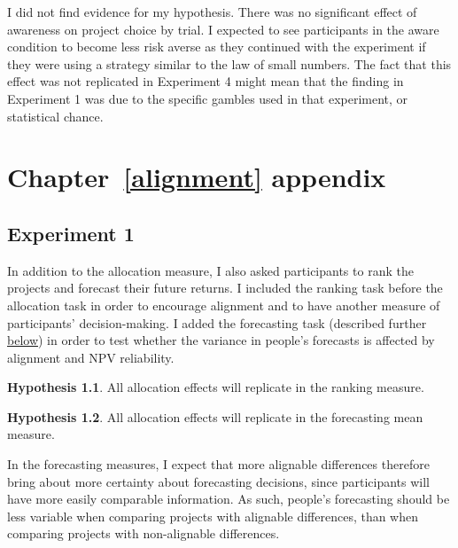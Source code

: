 \documentclass[a4paper, nobind, dvipsnames]{templates/ociamthesis}
\theoremstyle{definition}
\theoremstyle{definition}
\theoremstyle{definition}
\theoremstyle{definition}
\newtheorem{hypothesis}{Hypothesis}[chapter]
\theoremstyle{remark}
\begin{document}
I did not find evidence for my hypothesis. There was no significant effect of
awareness on project choice by trial. I expected to see participants in the
aware condition to become less risk averse as they continued with the experiment
if they were using a strategy similar to the law of small numbers. The fact that
this effect was not replicated in Experiment 4 might mean that the finding in
Experiment 1 was due to the specific gambles used in that experiment, or
statistical chance.

\hypertarget{alignment-appendix}{%
\chapter{Chapter~\ref{alignment} appendix}\label{alignment-appendix}}

\minitoc

\hypertarget{alignment-2-appendix}{%
\section{Experiment 1}\label{alignment-2-appendix}}

In addition to the allocation measure, I also asked participants to rank the projects and forecast their future returns.
I included the ranking task before the allocation task in order to encourage alignment and to have another measure of participants' decision-making. I added the forecasting task (described further \protect\hyperlink{forecasting-materials-alignment-2}{below}) in order to test whether the variance in people's forecasts is affected by alignment and NPV reliability.

\begin{hypothesis}
\protect\hypertarget{hyp:ranking-all-alignment-2}{}{\label{hyp:ranking-all-alignment-2} }All allocation effects will replicate in the ranking measure.
\end{hypothesis}

\begin{hypothesis}
\protect\hypertarget{hyp:forecasting-mean-all-alignment-2}{}{\label{hyp:forecasting-mean-all-alignment-2} }All allocation effects will replicate in the forecasting mean measure.
\end{hypothesis}

In the forecasting measures, I expect that more alignable differences therefore bring about more certainty about forecasting decisions, since participants will have more easily comparable information. As such, people's forecasting should be less variable when comparing projects with alignable differences, than when comparing projects with non-alignable differences.
\end{document}
